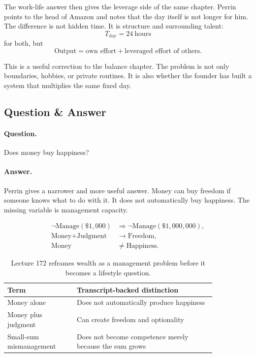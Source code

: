\documentclass[11pt,oneside]{book}
\begin{document}
The work-life answer then gives the leverage side of the same chapter. Perrin points to the head of Amazon and notes that the day itself is not longer for him. The difference is not hidden time. It is structure and surrounding talent:
\begin{equation}
T_{\text{day}} = 24\ \text{hours}
\end{equation}
for both, but
\begin{equation}
\text{Output}
=
\text{own effort}
+
\text{leveraged effort of others}.
\end{equation}

This is a useful correction to the balance chapter. The problem is not only boundaries, hobbies, or private routines. It is also whether the founder has built a system that multiplies the same fixed day.

\subsection{Question \& Answer}

\paragraph{Question.}
Does money buy happiness?

\paragraph{Answer.}
Perrin gives a narrower and more useful answer. Money can buy freedom if someone knows what to do with it. It does not automatically buy happiness. The missing variable is management capacity.

\begin{align}
\neg \text{Manage}(\$1{,}000)
&\Longrightarrow
\neg \text{Manage}(\$1{,}000{,}000),\\
\text{Money}+\text{Judgment}
&\to
\text{Freedom},\\
\text{Money}
&\neq
\text{Happiness}.
\end{align}

\begin{table}[h]
\centering
\small
\begin{tabular}{p{0.28\linewidth}p{0.56\linewidth}}
\hline
Term & Transcript-backed distinction \\
\hline
Money alone & Does not automatically produce happiness \\
Money plus judgment & Can create freedom and optionality \\
Small-sum mismanagement & Does not become competence merely because the sum grows \\
\hline
\end{tabular}
\caption{Lecture 172 reframes wealth as a management problem before it becomes a lifestyle question.}
\end{table}
\end{document}
